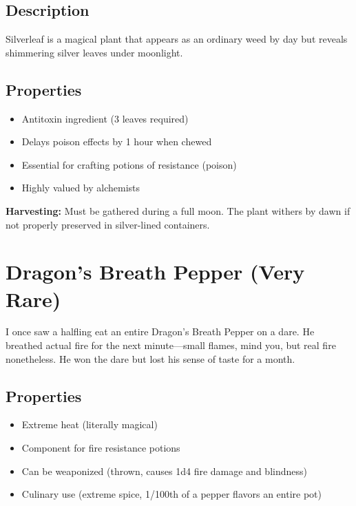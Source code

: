 \documentclass[letterpaper,twocolumn,openany]{dndbook}
\begin{document}
\subsection{Description}

Silverleaf is a magical plant that appears as an ordinary weed by day but reveals shimmering silver leaves under moonlight.

\subsection{Properties}

\begin{itemize}
    \item Antitoxin ingredient (3 leaves required)
    \item Delays poison effects by 1 hour when chewed
    \item Essential for crafting potions of resistance (poison)
    \item Highly valued by alchemists
\end{itemize}

\textbf{Harvesting:} Must be gathered during a full moon. The plant withers by dawn if not properly preserved in silver-lined containers.

\section{Dragon's Breath Pepper (Very Rare)}

\begin{DndReadAloud}
    I once saw a halfling eat an entire Dragon's Breath Pepper on a dare. He breathed actual fire for the next minute—small flames, mind you, but real fire nonetheless. He won the dare but lost his sense of taste for a month.
\end{DndReadAloud}

\subsection{Properties}

\begin{itemize}
    \item Extreme heat (literally magical)
    \item Component for fire resistance potions
    \item Can be weaponized (thrown, causes 1d4 fire damage and blindness)
    \item Culinary use (extreme spice, 1/100th of a pepper flavors an entire pot)
\end{itemize}
\end{document}
